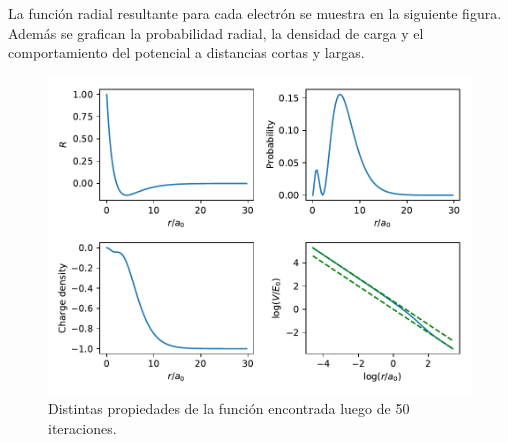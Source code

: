 \documentclass[paper=letter, fontsize=11pt]{scrartcl}
\begin{document}
\pagebreak
La funci\'on radial resultante para cada electr\'on se muestra en la siguiente figura. Adem\'as se grafican la probabilidad radial, la densidad de carga y el comportamiento del potencial a distancias cortas y largas.
\begin{figure}[ht]
	\centering
	\includegraphics[width=\linewidth]{complete.pdf}
	\caption{Distintas propiedades de la funci\'on encontrada luego de 50 iteraciones.}
\end{figure}
\end{document}
